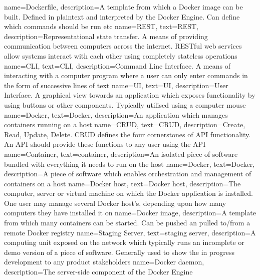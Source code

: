 {
    name={Dockerfile},
    description={A template from which a Docker image can be built. Defined in plaintext and interpreted by the Docker Engine. Can define which commands should be run etc}
}
{
    name={REST},
    text={REST},
    description={Representational state transfer. A means of providing communication between computers across the internet. RESTful web services allow systems interact with each other using completely stateless operations}
}
{
    name={CLI},
    text={CLI},
    description={Command Line Interface. A means of interacting with a computer program where a user can only enter commands in the form of successive lines of text}
}
{
    name={UI},
    text={UI},
    description={User Interface. A graphical view towards an application which exposes functionality by using buttons or other components. Typically utilised using a computer mouse}
}
{
    name={Docker},
    text={Docker},
    description={An application which manages containers running on a host}
}
{
    name={CRUD},
    text={CRUD},
    description={Create, Read, Update, Delete. CRUD defines the four cornerstones of API functionality. An API should provide these functions to any user using the API}
}
{
    name={Container},
    text={container},
    description={An isolated piece of software bundled with everything it needs to run on the host}
}
{
		name={Docker},
    text={Docker},
		description={A piece of software which enables orchestration and management of containers on a host}
}
{
		name={Docker host},
    text={Docker host},
		description={The computer, server or virtual machine on which the Docker application is installed. One user may manage several Docker host's, depending upon how many computers they have installed it on}
}
{
		name={Docker image},
		description={A template from which many containers can be started. Can be pushed an pulled to/from a remote Docker registry}
}
{
		name={Staging Server},
		text={staging server},
		description={A computing unit exposed on the network which typically runs an incomplete or demo version of a piece of software. Generally used to show the in progress development to any product stakeholders}
}
{
		name={Docker daemon},
		description={The server-side component of the Docker Engine}
}
